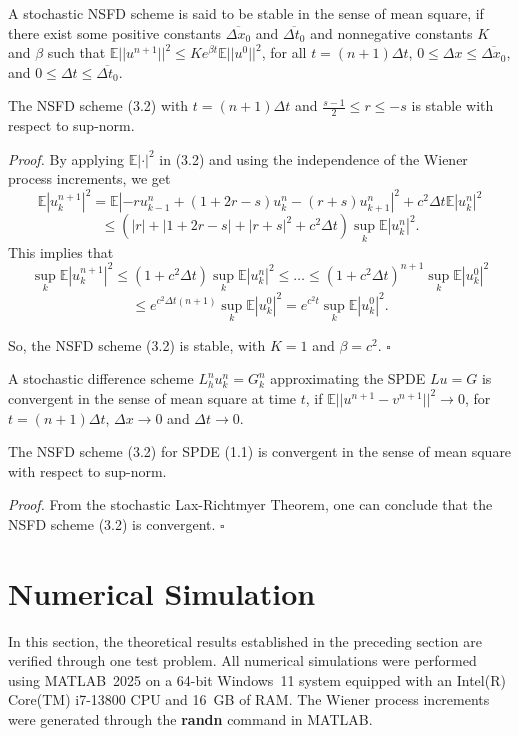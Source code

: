 \documentclass[twoside]{article}
\begin{document}
\begin{dfn} A stochastic NSFD scheme is said to be stable in the sense of mean square, if there exist some positive constants $\overline{\Delta x_0}$ and $\overline{\Delta t_0}$ and nonnegative constants $K$ and $\beta$ such that $\mathbb{E}||u^{n+1}||^2 \le Ke^{\beta t}\mathbb{E}||u^0||^2$, for all $t=(n+1)\Delta t$, $0 \le \Delta x \le \overline{\Delta x_0}$, and $0 \le \Delta t \le \overline{\Delta t_0}$.
\end{dfn}
\begin{thm} The NSFD scheme (3.2) with $t=(n+1)\Delta t$ and $\frac{s-1}{2} \le r \le -s$ is stable with respect to sup-norm.
\end{thm}
\noindent \textit{Proof.} By applying $\mathbb{E}|\cdot|^2$ in (3.2) and using the independence of the Wiener process increments, we get
$$\mathbb{E}|u_k^{n+1}|^2 = \mathbb{E}|-ru_{k-1}^n + (1+2r-s)u_k^n - (r+s)u_{k+1}^n|^2 + c^2\Delta t \mathbb{E}|u_k^n|^2$$
$$\le (|r|+|1+2r-s|+|r+s|^2 + c^2\Delta t)\sup_k \mathbb{E}|u_k^n|^2.$$
This implies that
$$\sup_k \mathbb{E}|u_k^{n+1}|^2 \le (1+c^2\Delta t) \sup_k \mathbb{E}|u_k^n|^2 \le \dots \le (1+c^2\Delta t)^{n+1} \sup_k \mathbb{E}|u_k^0|^2$$
$$\le e^{c^2\Delta t(n+1)} \sup_k \mathbb{E}|u_k^0|^2 = e^{c^2t} \sup_k \mathbb{E}|u_k^0|^2.$$

So, the NSFD scheme (3.2) is stable, with $K=1$ and $\beta=c^2$. \hfill $\square$

\begin{dfn} A stochastic difference scheme $L_h^n u_k^n = G_k^n$ approximating the SPDE $Lu = G$ is convergent in the sense of mean square at time $t$, if $\mathbb{E}||u^{n+1} - v^{n+1}||^2 \to 0$, for $t=(n+1)\Delta t$, $\Delta x \to 0$ and $\Delta t \to 0$.
\end{dfn}
\begin{thm}The NSFD scheme (3.2) for SPDE (1.1) is convergent in the sense of mean square with respect to sup-norm.
\end{thm}
\noindent \textit{Proof.} From the stochastic Lax-Richtmyer Theorem, one can conclude that the NSFD scheme (3.2) is convergent. \hfill $\square$

\section{Numerical Simulation}
In this section, the theoretical results established in the preceding section are
verified through one test problem. All numerical simulations were performed using
MATLAB~2025 on a 64-bit Windows~11 system equipped with an Intel(R) Core(TM)
i7-13800 CPU and 16~GB of RAM. The Wiener process increments were generated through
the {\bf{randn}} command in MATLAB.
\end{document}
